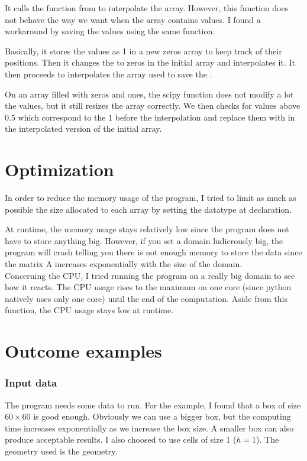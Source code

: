 It calls the function  from  to interpolate
the array. However, this function does not behave the way we want when the
array contains  values. I found a workaround\cite{interp} by saving
the  values using the same function.

Basically, it stores the  values as 1 in a new zeros array to keep
track of their positions. Then it changes the  to zeros in the
initial array and interpolates it. It then proceeds to interpolates the array
used to save the .

On an array filled with zeros and ones, the scipy function does not modify a
lot the values, but it still resizes the array correctly. We then checks for
values above $0.5$ which correspond to the $1$ before the interpolation and
replace them with  in the interpolated version of the initial array.


\newpage
\part{Optimization}
In order to reduce the memory usage of the program, I tried to limit as much
as possible the size allocated to each array by setting the datatype at
declaration.

At runtime, the memory usage stays relatively low since the program does not
have to store anything big. However, if you set a domain ludicrously big,
the program will crash telling you there is not enough memory to store the data
since the matrix A increases exponentially with the size of the domain.\\
Concerning the CPU, I tried running the program on a really big domain to see
how it reacts. The CPU usage rises to the maximum on one core (since python
natively uses only one core) until the end of the 
computation. Aside from this function, the CPU usage stays low at runtime.

\newpage
\part{Outcome examples}
\section{Input data}
The program needs some data to run. For the example, I found that a box of size
$\num{60} \times \num{60}$ is good enough. Obviously we can use a bigger box,
but the computing time increases exponentially as we increase the box size.
A smaller box can also produce acceptable results. I also choosed to use cells
of size 1 ($h = 1$). The geometry used is the  geometry.

